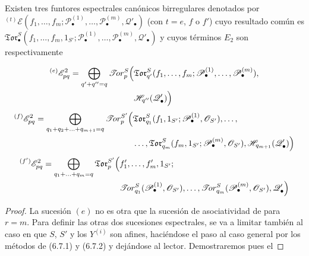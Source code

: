 \begin{proposition}[6.9.3]
Existen tres funtores espectrales canónicos birregulares denotados por
${}^{(t)}\mathscr E(f_1,\ldots,f_m;
\mathscr P_\bullet^{(1)},\ldots,\mathscr P_\bullet^{(m)},
\mathscr Q'_\bullet)$ (con $t=e$, $f$ o $f'$) cuyo resultado
común es
$\mathfrak{Tor}_\bullet^S(f_1,\ldots,f_m,1_{S'};
\mathscr P_\bullet^{(1)},\ldots,\mathscr P_\bullet^{(m)},
\mathscr Q'_\bullet)$
y cuyos términos $E_2$ son respectivamente

\[
\begin{split}
  {}^{(e)}\mathscr E_{pq}^2
  =\bigoplus_{q'+q''=q}
  \mathscr{T}\!or_p^S\Bigl(
  &\mathfrak{Tor}_{q'}^S
  (f_1,\ldots,f_m;
   \mathscr P_\bullet^{(1)},\ldots,\mathscr P_\bullet^{(m)}),\\
  &\mathscr H_{q''}(\mathscr Q'_\bullet)
  \Bigr)
\end{split}
\]
\[
\begin{split}
  {}^{(f)}\mathscr E_{pq}^2
  =\bigoplus_{q_1+q_2+\ldots+q_{m+1}=q}
  \mathscr{T}\!or_p^{S'}\Bigl(
  &\mathfrak{Tor}_{q_1}^S
  (f_1,1_{S'};\mathscr P_\bullet^{(1)},\mathscr O_{S'}),\ldots,\\
  &\ldots,\mathfrak{Tor}_{q_m}^S
  (f_m,1_{S'};\mathscr P_\bullet^{(m)},\mathscr O_{S'}),
  \mathscr H_{q_{m+1}}(\mathscr Q'_\bullet)
  \Bigr)
\end{split}
\]
\[
\begin{split}
  {}^{(f')}\mathscr E_{pq}^2
  =\bigoplus_{q_1+\ldots+q_m=q}
  \mathfrak{Tor}_p^{S'}\Bigl(
  &f'_1,\ldots,f'_m,1_{S'};\\
  &\mathscr{T}\!or_{q_1}^S
  (\mathscr P_\bullet^{(1)},\mathscr O_{S'}),\ldots,
  \mathscr{T}\!or_{q_m}^S
  (\mathscr P_\bullet^{(m)},\mathscr O_{S'}),
  \mathscr Q'_\bullet
  \Bigr)
\end{split}
\]
\end{proposition}

\begin{proof}
La sucesión $(e)$ no es otra que la sucesión de asociatividad de
 para $r=m$. Para definir las otras dos sucesiones espectrales, se va a limitar también al caso en que $S$, $S'$ y los
$Y^{(i)}$ son afines, haciéndose el paso al caso general por los métodos de (6.7.1) y (6.7.2) y dejándose al lector. Demostraremos pues el
\end{proof}

